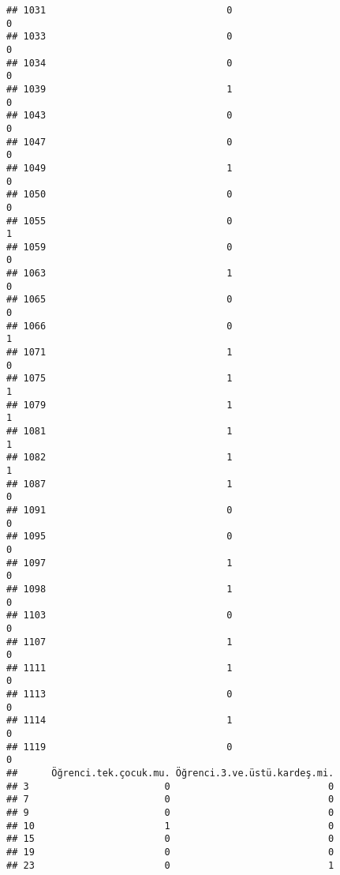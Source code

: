 \documentclass[
]{article}
\begin{document}
\begin{verbatim}
## 1031                                0                                0
## 1033                                0                                0
## 1034                                0                                0
## 1039                                1                                0
## 1043                                0                                0
## 1047                                0                                0
## 1049                                1                                0
## 1050                                0                                0
## 1055                                0                                1
## 1059                                0                                0
## 1063                                1                                0
## 1065                                0                                0
## 1066                                0                                1
## 1071                                1                                0
## 1075                                1                                1
## 1079                                1                                1
## 1081                                1                                1
## 1082                                1                                1
## 1087                                1                                0
## 1091                                0                                0
## 1095                                0                                0
## 1097                                1                                0
## 1098                                1                                0
## 1103                                0                                0
## 1107                                1                                0
## 1111                                1                                0
## 1113                                0                                0
## 1114                                1                                0
## 1119                                0                                0
##      Öğrenci.tek.çocuk.mu. Öğrenci.3.ve.üstü.kardeş.mi.
## 3                        0                            0
## 7                        0                            0
## 9                        0                            0
## 10                       1                            0
## 15                       0                            0
## 19                       0                            0
## 23                       0                            1

\end{verbatim}
\end{document}
